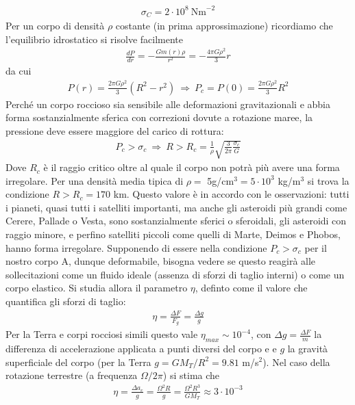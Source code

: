 \documentclass[a4paper, oneside]{book}
\begin{document}
\begin{gather*}
    \sigma_C = 2 \cdot 10^{8} \ \text{Nm}^{-2}
\end{gather*}
Per un corpo di densità $\rho$ costante (in prima approssimazione)
ricordiamo che l'equilibrio idrostatico si risolve facilmente 
\begin{gather*}
    \frac{dP}{dr} = - \frac{Gm(r)\rho}{r^{2}} = - \frac{4\pi G \rho^{2}}{3}r
\end{gather*}
da cui 
\begin{gather*}
    P(r) = \frac{2\pi G\rho^{2}}{3}(R^{2} - r^{2}) \ \Longrightarrow \ P_c = P(0) = \frac{2\pi G\rho^{2}}{3}R^{2}
\end{gather*}
Perché un corpo roccioso sia sensibile alle deformazioni gravitazionali e abbia forma sostanzialmente 
sferica con correzioni dovute a rotazione maree, la pressione deve essere maggiore del carico di rottura:
\begin{gather*}
    P_c > \sigma_c \ \Longrightarrow \ R > R_c = \frac{1}{\rho}\sqrt{\frac{3}{2\pi}\frac{\sigma_c}{G}}  
\end{gather*}
Dove $R_c$ è il raggio critico oltre al quale il corpo non potrà più avere
una forma irregolare. Per una densità media tipica di $\rho =$ 5g/cm$^{3} = 5\cdot 10^{3}$ kg/m$^{3}$ 
si trova la condizione $R > R_c = 170$ km. Questo valore è in accordo con le osservazioni: 
tutti i pianeti, quasi tutti i satelliti importanti, ma anche gli asteroidi più grandi come 
Cerere, Pallade o Vesta, sono sostanzialmente sferici o sferoidali, gli 
asteroidi con raggio minore, e perfino satelliti piccoli 
come quelli di Marte, Deimos e Phobos, hanno forma irregolare. 
Supponendo di essere nella condizione $P_c > \sigma_c$ per il nostro corpo A, 
dunque deformabile, bisogna vedere se questo reagirà alle sollecitazioni come un fluido 
ideale (assenza di sforzi di taglio interni)  o come un corpo elastico. Si studia allora
il parametro $\eta$, definto come il valore che quantifica gli sforzi di taglio: 
\begin{gather*}
    \eta = \frac{\Delta F}{F_g} = \frac{\Delta g}{g}
\end{gather*}
Per la Terra e corpi rocciosi simili questo vale $\eta_{max  } \sim 10^{-4}$,
con $\Delta g = \frac{\Delta F}{m}$ la differenza di accelerazione applicata 
a punti diversi del corpo e e $g$ la gravità superficiale del corpo (per la Terra
$g = GM_T /R^{2} = 9.81$ m/s$^{2}$). Nel caso della rotazione terrestre (a frequenza $\Omega /2\pi$)
si stima che 
\begin{gather*}
    \eta = \frac{\Delta a_c}{g} = \frac{\Omega^{2}R}{g} = \frac{\Omega^{2}R^{3}}{GM_T} \approx 3 \cdot 10^{-3}
\end{gather*}
\end{document}
